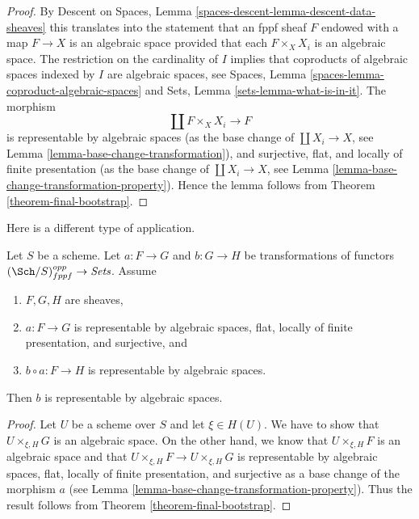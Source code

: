 \begin{proof}
By Descent on Spaces, Lemma \ref{spaces-descent-lemma-descent-data-sheaves}
this translates into the statement that an fppf sheaf $F$
endowed with a map $F \to X$ is an algebraic space provided that
each $F \times_X X_i$ is an algebraic space.
The restriction on the cardinality of $I$ implies that
coproducts of algebraic spaces indexed by $I$ are algebraic spaces, see
Spaces, Lemma \ref{spaces-lemma-coproduct-algebraic-spaces}
and
Sets, Lemma \ref{sets-lemma-what-is-in-it}.
The morphism
$$
\coprod F \times_X X_i \longrightarrow F
$$
is representable by algebraic spaces (as the base change of
$\coprod X_i \to X$, see Lemma \ref{lemma-base-change-transformation}),
and surjective, flat, and locally of finite presentation
(as the base change of $\coprod X_i \to X$, see
Lemma \ref{lemma-base-change-transformation-property}).
Hence the lemma follows from Theorem \ref{theorem-final-bootstrap}.
\end{proof}

\noindent
Here is a different type of application.

\begin{lemma}
\label{lemma-representable-by-spaces-cover}
Let $S$ be a scheme. Let $a : F \to G$ and $b : G \to H$ be
transformations of functors $(\Sch/S)_{fppf}^{opp} \to \textit{Sets}$.
Assume
\begin{enumerate}
\item $F, G, H$ are sheaves,
\item $a : F \to G$ is representable by algebraic spaces, flat,
locally of finite presentation, and surjective, and
\item $b \circ a : F \to H$ is representable by algebraic spaces.
\end{enumerate}
Then $b$ is representable by algebraic spaces.
\end{lemma}

\begin{proof}
Let $U$ be a scheme over $S$ and let $\xi \in H(U)$. We have to show that
$U \times_{\xi, H} G$ is an algebraic space. On the other hand, we know
that $U \times_{\xi, H} F$ is an algebraic space and that
$U \times_{\xi, H} F \to U \times_{\xi, H} G$ is representable by
algebraic spaces, flat, locally of finite presentation, and surjective
as a base change of the morphism $a$ (see
Lemma \ref{lemma-base-change-transformation-property}).
Thus the result follows from Theorem \ref{theorem-final-bootstrap}.
\end{proof}

